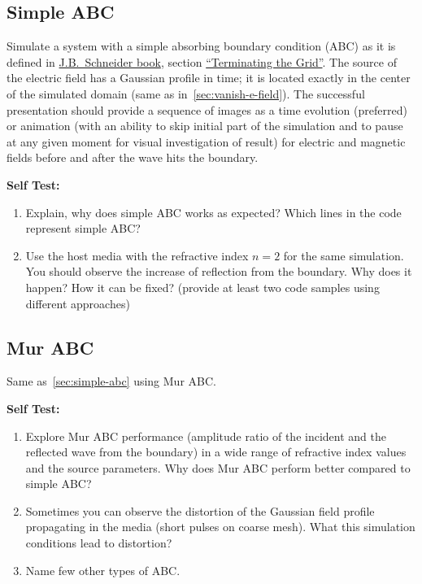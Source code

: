\documentclass[11pt]{article}
\begin{document}
\subsection{Simple ABC\label{sec:simple-abc}}

Simulate a system with a simple absorbing boundary condition (ABC) as it
is defined in \href{http://www.eecs.wsu.edu/~schneidj/ufdtd/}{J.B.~Schneider book}, section \href{https://github.com/john-b-schneider/uFDTD/blob/b17f574631d5ffdf1167f23aa7bc74a6819fd171/fdtd-intro.tex#L1039}{ ``Terminating the
  Grid''}.
The source of the electric field has a Gaussian profile in time; it is
located exactly in the center of the simulated domain (same as in~\ref{sec:vanish-e-field}). The successful
presentation should provide a sequence of images as a time evolution (preferred) or animation (with an ability to skip initial part of the simulation and to pause at any given moment for visual investigation of result) for electric and magnetic fields before and after the
wave hits the boundary.

\textbf{Self Test:}
\begin{enumerate}
\item Explain, why does simple ABC works as expected? Which lines in
  the code represent simple ABC?
\item Use the host media with the refractive index $n=2$ for the same
  simulation. You should observe the increase of reflection from the
  boundary. Why does it happen? How it can be fixed? (provide at least two code samples using different approaches)
\end{enumerate}

\subsection{Mur ABC}
\label{sec:mur-abc}
Same as~\ref{sec:simple-abc} using Mur ABC.

\textbf{Self Test:}
\begin{enumerate}
\item Explore Mur ABC performance (amplitude ratio of the incident and
  the reflected wave from the boundary) in a wide range of refractive
  index values and the source parameters. Why does Mur ABC perform
  better compared to simple ABC?
\item Sometimes you can observe the distortion of the Gaussian field
  profile propagating in the media (short pulses on coarse mesh). What this simulation conditions lead to distortion?
\item Name few other types of ABC.
\end{enumerate}
\end{document}

